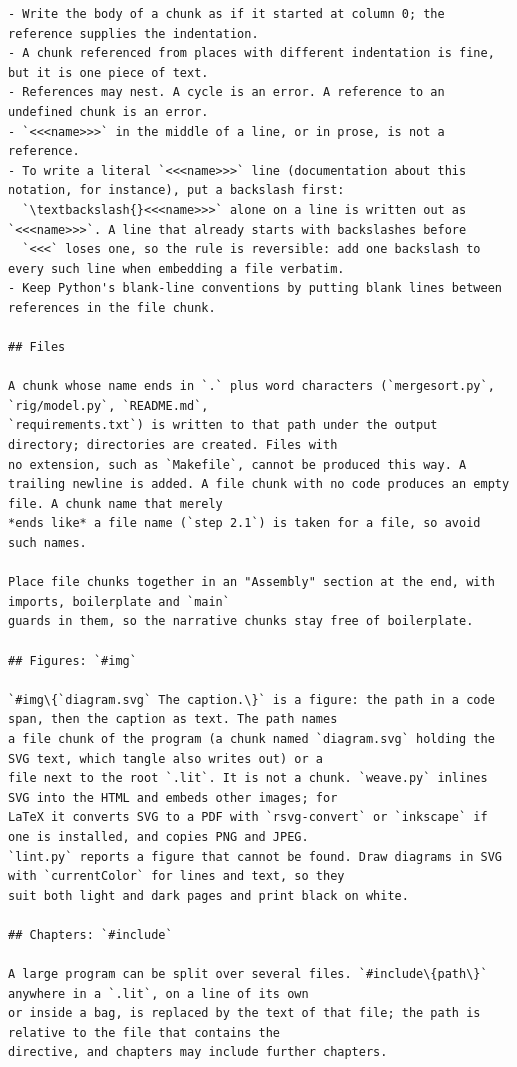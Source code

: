 \documentclass[10pt,a4paper]{article}
\newcounter{chunk}
\begin{document}
\begin{Verbatim}
- Write the body of a chunk as if it started at column 0; the reference supplies the indentation.
- A chunk referenced from places with different indentation is fine, but it is one piece of text.
- References may nest. A cycle is an error. A reference to an undefined chunk is an error.
- `<<<name>>>` in the middle of a line, or in prose, is not a reference.
- To write a literal `<<<name>>>` line (documentation about this notation, for instance), put a backslash first:
  `\textbackslash{}<<<name>>>` alone on a line is written out as `<<<name>>>`. A line that already starts with backslashes before
  `<<<` loses one, so the rule is reversible: add one backslash to every such line when embedding a file verbatim.
- Keep Python's blank-line conventions by putting blank lines between references in the file chunk.

## Files

A chunk whose name ends in `.` plus word characters (`mergesort.py`, `rig/model.py`, `README.md`,
`requirements.txt`) is written to that path under the output directory; directories are created. Files with
no extension, such as `Makefile`, cannot be produced this way. A trailing newline is added. A file chunk with no code produces an empty file. A chunk name that merely
*ends like* a file name (`step 2.1`) is taken for a file, so avoid such names.

Place file chunks together in an "Assembly" section at the end, with imports, boilerplate and `main`
guards in them, so the narrative chunks stay free of boilerplate.

## Figures: `#img`

`#img\{`diagram.svg` The caption.\}` is a figure: the path in a code span, then the caption as text. The path names
a file chunk of the program (a chunk named `diagram.svg` holding the SVG text, which tangle also writes out) or a
file next to the root `.lit`. It is not a chunk. `weave.py` inlines SVG into the HTML and embeds other images; for
LaTeX it converts SVG to a PDF with `rsvg-convert` or `inkscape` if one is installed, and copies PNG and JPEG.
`lint.py` reports a figure that cannot be found. Draw diagrams in SVG with `currentColor` for lines and text, so they
suit both light and dark pages and print black on white.

## Chapters: `#include`

A large program can be split over several files. `#include\{path\}` anywhere in a `.lit`, on a line of its own
or inside a bag, is replaced by the text of that file; the path is relative to the file that contains the
directive, and chapters may include further chapters.


\end{Verbatim}
\end{document}
